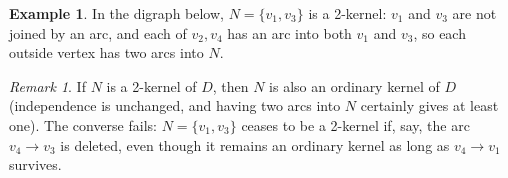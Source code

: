 \documentclass[11pt]{article}
\theoremstyle{plain}
\theoremstyle{definition}
\newtheorem{example}[theorem]{Example}
\theoremstyle{remark}
\newtheorem{remark}[theorem]{Remark}
\begin{document}
\begin{example}
  In the digraph below, $N=\{v_1,v_3\}$ is a 2-kernel: $v_1$ and $v_3$ are not joined by an arc, and each of $v_2,v_4$ has an arc into both $v_1$ and $v_3$, so each outside vertex has two arcs into $N$.

  \begin{center}
  \end{center}
\end{example}

\begin{remark}
  If $N$ is a 2-kernel of $D$, then $N$ is also an ordinary kernel of $D$ (independence is unchanged, and having two arcs into $N$ certainly gives at least one). The converse fails: $N=\{v_1,v_3\}$ ceases to be a 2-kernel if, say, the arc $v_4\to v_3$ is deleted, even though it remains an ordinary kernel as long as $v_4\to v_1$ survives.
\end{remark}
\end{document}
